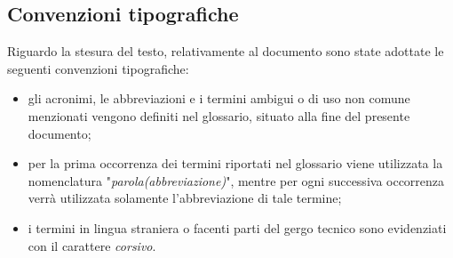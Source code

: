 \subsection{Convenzioni tipografiche}
Riguardo la stesura del testo, relativamente al documento sono state adottate le seguenti convenzioni tipografiche:
\begin{itemize}
	\item gli acronimi, le abbreviazioni e i termini ambigui o di uso non comune menzionati vengono definiti nel glossario, situato alla fine del presente documento;
	\item per la prima occorrenza dei termini riportati nel glossario viene utilizzata la nomenclatura "\emph{parola(abbreviazione)}", mentre per ogni successiva occorrenza verrà utilizzata solamente l'abbreviazione di tale termine;
	\item i termini in lingua straniera o facenti parti del gergo tecnico sono evidenziati con il carattere \emph{corsivo}.
\end{itemize}